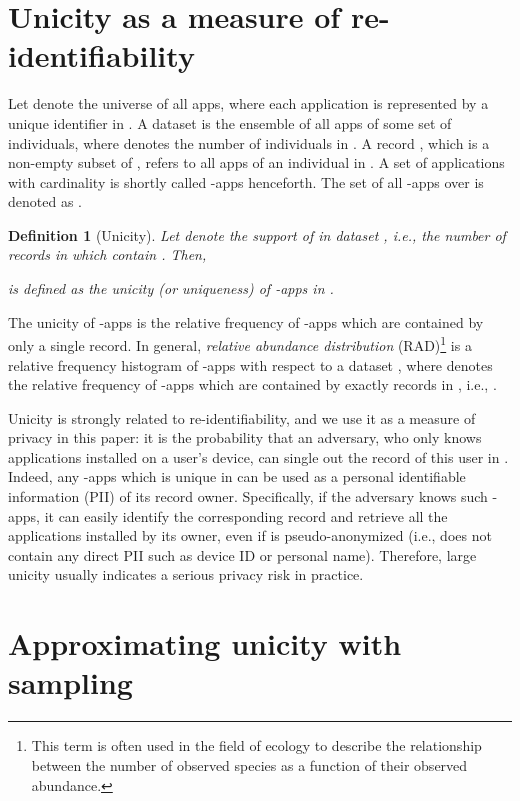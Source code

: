 \documentclass{acm_proc_article-sp}
\theoremstyle{plain}
\newtheorem{definition}{Definition}
\theoremstyle{plain}
\theoremstyle{plain}
\theoremstyle{plain}
\theoremstyle{plain}
\theoremstyle{plain}
\begin{document}
\section{Unicity as a measure of re-identifiability}

Let  denote the universe of all apps, where each application is represented by a unique identifier in . A dataset  is the ensemble of all apps of some set of individuals, where  denotes the number of individuals in . A record , which is a non-empty subset of , refers to all apps of an individual  in . 
A set of applications with cardinality  is shortly called -apps henceforth. The set of all -apps over  is denoted as .


\begin{definition}[Unicity]
\label{def:unicity}
Let  denote the support of  in dataset , i.e., the number of records in  which contain . Then, 

is defined as the unicity (or uniqueness) of -apps in .
\end{definition}


The unicity of -apps is the relative frequency of -apps which are contained by only a single record. In general, \emph{relative abundance distribution} (RAD)\footnote{This term is often used in the field of ecology 
to describe the relationship between the number of observed species as a function of their observed abundance.} is a relative frequency histogram  of -apps with respect to a dataset , where  denotes the relative frequency of -apps which are contained by exactly  records in , i.e., 
.


Unicity is strongly related to re-identifiability, and we use it as a measure of privacy in this paper:
it is the probability that an adversary, who only knows  applications installed on a user's device, can single out the record of this user in . 
Indeed,  any -apps which is unique in  can be used as a personal identifiable information (PII) of its record owner. Specifically, if the adversary knows such -apps, it can easily identify the corresponding record and retrieve all the applications installed by its owner, even if  is pseudo-anonymized (i.e., does not contain any direct PII such as device ID or personal name).  
Therefore, large unicity usually indicates a serious privacy risk in practice. 







\section{Approximating unicity with sampling}
\label{sec:sampling}
\end{document}
